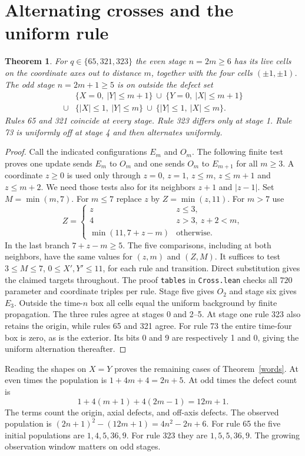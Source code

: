 \documentclass[11pt]{article}
\newtheorem{theorem}{Theorem}
\begin{document}
\newpage
\section{Alternating crosses and the uniform rule}
\begin{theorem}\label{cross}
For $q\in\{65,321,323\}$ the even stage $n=2m\ge6$ has its live cells on
the coordinate axes out to distance $m$, together with the four cells
$(\pm1,\pm1)$. The odd stage $n=2m+1\ge5$ is on outside the defect set
\[
\begin{split}
 &\{X=0,\ |Y|\le m+1\}\ \cup\ \{Y=0,\ |X|\le m+1\}\\
 {}\cup{}&\{|X|\le1,\ |Y|\le m\}\ \cup\ \{|Y|\le1,\ |X|\le m\}.
\end{split}
\]
Rules 65 and 321 coincide at every stage. Rule 323 differs only at stage 1.
Rule 73 is uniformly off at stage 4 and then alternates uniformly.
\end{theorem}
\begin{proof}
Call the indicated configurations $E_m$ and $O_m$. The following finite
test proves one update sends $E_m$ to $O_m$ and one sends $O_m$ to $E_{m+1}$
for all $m\ge3$. A coordinate $z\ge0$ is used only through $z=0$, $z=1$,
$z\le m$, $z\le m+1$ and $z\le m+2$. We need those tests also for its
neighbors $z+1$ and $|z-1|$. Set $M=\min(m,7)$. For $m\le7$ replace
$z$ by $Z=\min(z,11)$. For $m>7$ use
\[
 Z=\begin{cases}
 z&z\le3,\\
 4&z>3,\ z+2<m,\\
 \min(11,7+z-m)&\text{otherwise}.
 \end{cases}
\]
In the last branch $7+z-m\ge5$. The five comparisons, including at both
neighbors, have the same values for $(z,m)$ and $(Z,M)$.
It suffices to test $3\le M\le7$, $0\le X',Y'\le11$,
for each rule and transition. Direct substitution gives the claimed targets
throughout. The proof \texttt{tables} in \texttt{Cross.lean} checks all $720$
parameter and coordinate triples per rule.
Stage five gives $O_2$ and stage six gives $E_3$. Outside the
time-$n$ box all cells equal the uniform background by finite propagation.
The three rules agree at stages 0 and 2--5. At stage one rule 323 also
retains the origin, while rules 65 and 321 agree. For rule 73 the entire
time-four box is zero, as is the exterior. Its bits 0 and 9 are respectively 1
and 0, giving the uniform alternation thereafter.
\end{proof}
Reading the shapes on $X=Y$ proves the remaining cases of
Theorem~\ref{words}. At even times the population is $1+4m+4=2n+5$.
At odd times the defect count is
\[
  1+4(m+1)+4(2m-1)=12m+1.
\]
The terms count the origin, axial defects, and off-axis defects. The observed
population is $(2n+1)^2-(12m+1)=4n^2-2n+6$.
For rule 65 the five initial populations are $1,4,5,36,9$. For rule 323 they
are $1,5,5,36,9$. The growing observation window matters on odd stages.
\end{document}
